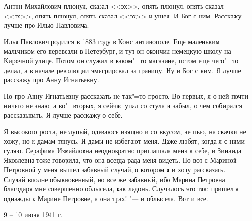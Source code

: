 
Антон Михайлович плюнул, сказал <<эх>>, опять плюнул, опять сказал <<эх>>, опять плюнул, опять сказал <<эх>> и ушел. И Бог с ним. Расскажу лучше про Илью Павловича.

Илья Павлович родился в 1883 году в Константинополе. Еще маленьким мальчиком его перевезли в Петербург, и тут он окончил немецкую школу на Кирочной улице. Потом он служил в каком"=то магазине, потом еще чего"=то делал, а в начале революции эмигрировал за границу. Ну и Бог с ним. Я лучше расскажу про Анну Игнатьевну.

Но про Анну Игнатьевну рассказать не так"=то просто. Во-первых, я о ней почти ничего не знаю, а во"=вторых, я сейчас упал со стула и забыл, о чем собирался рассказывать. Я лучше расскажу о себе.

Я высокого роста, неглупый, одеваюсь изящно и со вкусом, не пью, на скачки не хожу, но к дамам тянусь. И дамы не избегают меня. Даже любят, когда я с ними гуляю. Серафима Измайловна неоднократно приглашала меня к себе, и Зинаида Яковлевна тоже говорила, что она всегда рада меня видеть. Но вот с Мариной Петровной у меня вышел забавный случай, о котором я и хочу рассказать. Случай вполне обыкновенный, но все же забавный, ибо Марина Петровна благодаря мне совершенно облысела, как ладонь. Случилось это так: пришел я однажды к Марине Петровне, а она трах! "--- и облысела. Вот и все. 

\begin{flushright} 9 -- 10 июня 1941 г. \end{flushright} 